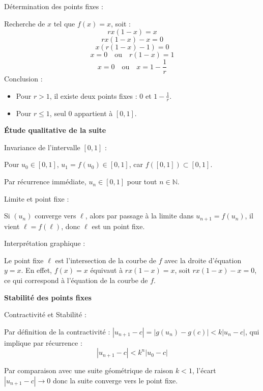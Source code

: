 \documentclass[10pt,a4paper]{article}
\begin{document}

\q Détermination des points fixes :

Recherche de \( x \) tel que \( f(x) = x \), soit :
\[
r x (1 - x) = x
\]
\[
r x (1 - x) - x = 0
\]
\[
x (r (1 - x) - 1) = 0
\]
\[
x = 0 \quad \text{ou} \quad r (1 - x) = 1
\]
\[
x = 0 \quad \text{ou} \quad x = 1 - \frac{1}{r}
\]
Conclusion :
\begin{itemize}
    \item Pour \( r > 1 \), il existe deux points fixes : \( 0 \) et \( 1 - \frac{1}{r} \).
    \item Pour \( r \leq 1 \), seul \( 0 \) appartient à \( [0,1] \).
\end{itemize}

\bigskip
\textbf{Étude qualitative de la suite}

\q Invariance de l'intervalle \( [0,1] \) :

Pour \( u_0 \in [0,1] \), \( u_1 = f(u_0) \in [0,1] \), car \( f([0,1]) \subset [0,1] \).

Par récurrence immédiate, \( u_n \in [0,1] \) pour tout \( n \in \mathbb{N} \).


\q Limite et point fixe :

Si \( (u_n) \) converge vers \( \ell \), alors par passage à la limite dans \( u_{n+1} = f(u_n) \),
il vient \( \ell = f(\ell) \), donc \( \ell \) est un point fixe.


\q Interprétation graphique :

Le point fixe \( \ell \) est l'intersection de la courbe de \( f \) avec la droite d'équation \( y =
x \). En effet, \( f(x) = x \) équivaut à \( r x (1 - x) = x \), soit \( r x (1 - x) - x = 0 \), ce
qui correspond à l'équation de la courbe de \( f \).

\bigskip
\textbf{Stabilité des points fixes}

\q Contractivité et Stabilité :

Par définition de la contractivité : $|u_{n+1} - c| = |g(u_n) - g(c)| < k|u_{n} - c|$, qui implique
par récurrence :
$$|u_{n+1} - c| < k^n |u_0 - c|$$

Par comparaison avec une suite géométrique de raison $k < 1$, l'écart $|u_{n+1} - c| \to 0$ donc la
suite converge vers le point fixe.
\end{document}
